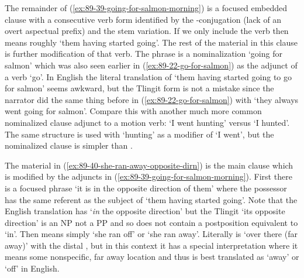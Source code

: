 The remainder of (\ref{ex:89-39-going-for-salmon-morning}) is a focused embedded clause with a consecutive verb form identified by the -conjugation (lack of an overt aspectual prefix) and the  stem variation.
If we only include the verb then  means roughly ‘them having started going’.
The rest of the material in this clause is further modification of that verb.
The phrase  is a nominalization ‘going for salmon’ which was also seen earlier in (\ref{ex:89-22-go-for-salmon}) as the adjunct of a verb ‘go’.
In English the literal translation of  ‘them having started going to go for salmon’ seems awkward, but the Tlingit form is not a mistake since the narrator did the same thing before in (\ref{ex:89-22-go-for-salmon}) with  ‘they always went going for salmon’.
Compare this with another much more common nominalized clause adjunct to a motion verb:  ‘I went hunting’ versus  ‘I hunted’.
The same structure is used with  ‘hunting’ as a modifier of  ‘I went’, but the nominalized clause  is simpler than .

The material in (\ref{ex:89-40-she-ran-away-opposite-dirn}) is the main clause which is modified by the adjuncts in (\ref{ex:89-39-going-for-salmon-morning}).
First there is a focused phrase  ‘it is in the opposite direction of them’ where the possessor  has the same referent as the subject of  ‘them having started going’.
Note that the English translation has ‘\emph{in} the opposite direction’ but the Tlingit  ‘its opposite direction’ is an NP not a PP and so does not contain a postposition equivalent to ‘in’.
Then  means simply ‘she ran off’ or ‘she ran away’.
Literally  is ‘over there (far away)’ with the distal , but in this context it has a special interpretation where it means some nonspecific, far away location and thus is best translated as ‘away’ or ‘off’ in English.

